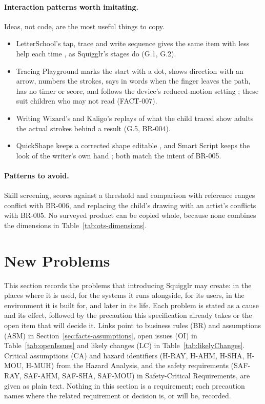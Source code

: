 \documentclass[12pt]{article}
\renewcommand{\_}{\textunderscore\allowbreak}%
\begin{document}
\paragraph{Interaction patterns worth imitating.}
Ideas, not code, are the most useful things to copy.
\begin{itemize}
  \item LetterSchool's tap, trace and write sequence gives the same item with
  less help each time \citep{LetterSchool2026HowWhy}, as Squigglr's stages do
  (G.1, G.2).
  \item Tracing Playground marks the start with a dot, shows direction with an
  arrow, numbers the strokes, says in words when the finger leaves the path, has
  no timer or score, and follows the device's reduced-motion setting
  \citep{TracingTown2026Playground}; these suit children who may not read
  (FACT-007).
  \item Writing Wizard's and Kaligo's replays of what the child traced
  \citep{Abel2026WritingWizard,LearnAndGo2026Teachers} show adults the actual
  strokes behind a result (G.5, BR-004).
  \item QuickShape keeps a corrected shape editable
  \citep{Procreate2026QuickShape}, and Smart Script keeps the look of the
  writer's own hand \citep{Apple2024SmartScript}; both match the intent of
  BR-005.
\end{itemize}

\paragraph{Patterns to avoid.}
Skill screening, scores against a threshold and comparison with reference ranges
conflict with BR-006, and replacing the child's drawing with an artist's
conflicts with BR-005. No surveyed product can be copied whole, because none
combines the dimensions in Table~\ref{tab:ots-dimensions}.

\section{New Problems}
\label{sec:new-problems}
This section records the problems that introducing Squigglr may create: in the
places where it is used, for the systems it runs alongside, for its users, in
the environment it is built for, and later in its life. Each problem is stated
as a cause and its effect, followed by the precaution this specification already
takes or the open item that will decide it. Links point to business rules (BR)
and assumptions (ASM) in Section~\ref{sec:facts-assumptions}, open issues (OI)
in Table~\ref{tab:openIssues} and likely changes (LC) in
Table~\ref{tab:likelyChanges}. Critical assumptions (CA) and hazard identifiers
(H-RAY, H-AHM, H-SHA, H-MOU, H-MUH) from the Hazard Analysis, and the safety
requirements (SAF-RAY, SAF-AHM, SAF-SHA, SAF-MOU) in Safety-Critical
Requirements, are given as plain text. Nothing in this section is a requirement;
each precaution names where the related requirement or decision is, or will be,
recorded.
\end{document}
